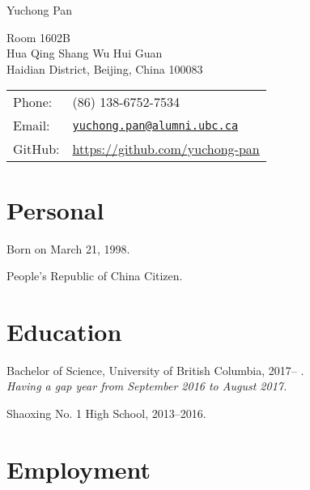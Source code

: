 \documentclass[letterpaper]{article}
\def\name{Yuchong Pan}
\renewenvironment{itemize}{
  \begin{list}{}{
    \setlength{\leftmargin}{1.5em}
  }
}{
  \end{list}
}
\begin{document}
{\huge \name}


\vspace{0.25in}

\begin{minipage}{0.45\linewidth}
  Room 1602B \\
  Hua Qing Shang Wu Hui Guan \\
  Haidian District, Beijing, China 100083
\end{minipage}
\begin{minipage}{0.45\linewidth}
  \begin{tabular}{ll}
    Phone: & (86) 138-6752-7534 \\
    Email: & \href{mailto:yuchong.pan@alumni.ubc.ca}{\tt yuchong.pan@alumni.ubc.ca} \\
    GitHub: & \url{https://github.com/yuchong-pan}
  \end{tabular}
\end{minipage}


\section*{Personal}

\begin{itemize}
    \item Born on March 21, 1998.

    \item People's Republic of China Citizen.
\end{itemize}


\section*{Education}

\begin{itemize}
  \item Bachelor of Science, University of British Columbia, 2017-- .\\
  \emph{Having a gap year from September 2016 to August 2017.}

  \item Shaoxing No. 1 High School, 2013--2016.
\end{itemize}


\section*{Employment}
\end{document}
